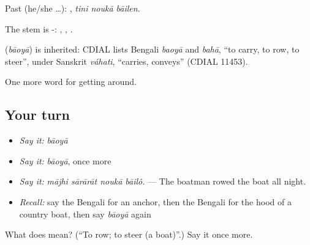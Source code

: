 Past (he/she …):   , \emph{tini noukā bāilen}.

The stem is -:  ,  ,  .

\begin{cousinweb}
\textbf{} (\emph{bāoyā}) is inherited: CDIAL lists Bengali \emph{baoyā} and \emph{bahā}, \textquotedblleft{}to carry, to row, to steer\textquotedblright{}, under Sanskrit \emph{váhati}, \textquotedblleft{}carries, conveys\textquotedblright{} (CDIAL 11453).
\end{cousinweb}

\begin{grammarlens}[title={What you've built}]
One more word for getting around.
\end{grammarlens}

\subsection*{Your turn}
\begin{itemize}
\raggedright
  \item \emph{Say it:} \emph{bāoyā}
  \item \emph{Say it:} \emph{bāoyā}, once more
  \item \emph{Say it:} \emph{mājhi sārārāt noukā bāilô.} — The boatman rowed the boat all night.
  \item \emph{Recall:} say the Bengali for an anchor, then the Bengali for the hood of a country boat, then say \emph{bāoyā} again
\end{itemize}

\begin{tcolorbox}[breakable,colback=teal!4,colframe=teal!35!black,title={Before you move on}]
What does  mean? (\textquotedblleft{}To row; to steer (a boat)\textquotedblright{}.) Say it once more.
\end{tcolorbox}
